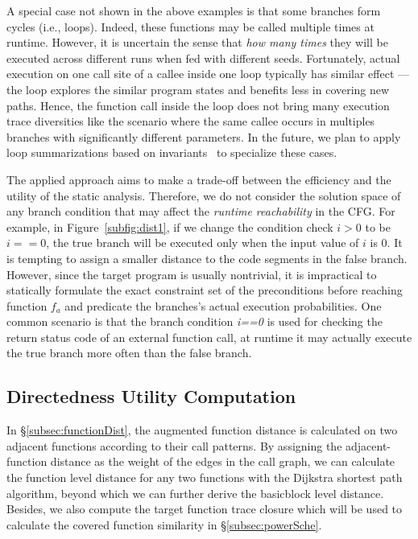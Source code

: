 A special case not shown in the above examples is that some branches form cycles (i.e., loops). Indeed, these functions may be called multiple times at runtime. However, it is uncertain the sense that \emph{how many times} they will be executed across different runs when fed with different seeds. Fortunately, actual execution on one call site of a callee inside one loop typically has similar effect --- the loop explores the similar program states and benefits less in covering new paths. Hence, the function call inside the loop does not bring many execution trace diversities like the scenario where the same callee occurs in multiples branches with significantly different parameters. In the future, we plan to apply loop summarizations based on invariants~\cite{issta15-slooper,loopinv,loopster,xie2016proteus,xie2017automatic,fib} to specialize these cases.

The applied approach aims to make a trade-off between the efficiency and the utility of the static analysis. Therefore, we do not consider the solution space of any branch condition that may affect the \emph{runtime reachability} in the CFG. For example, in Figure~\ref{subfig:dist1}, if we change the condition check ${i>0}$ to be ${i==0}$, the true branch will be executed only when the input value of $i$ is 0. It is tempting to assign a smaller distance to the code segments in the false branch. However, since the target program is usually nontrivial, it is impractical to statically formulate the exact constraint set of the preconditions before reaching function $f_a$ and predicate the branches's actual execution probabilities. One common scenario is that the branch condition \emph{i==0} is used for checking the return status code of an external function call, at runtime it may actually execute the true branch more often than the false branch.




\subsection{Directedness Utility Computation} \label{subsec:UtilityComputation}

In \S\ref{subsec:functionDist}, the augmented function distance is calculated on two adjacent functions according to their call patterns. By assigning  the adjacent-function distance as the weight of the edges in the call graph, we can calculate the function level distance for any two functions with the Dijkstra shortest path algorithm, beyond which we can further derive the 
basicblock level distance. 
Besides, we also compute the target function trace closure which will be used to calculate the covered function similarity in \S\ref{subsec:powerSche}.

